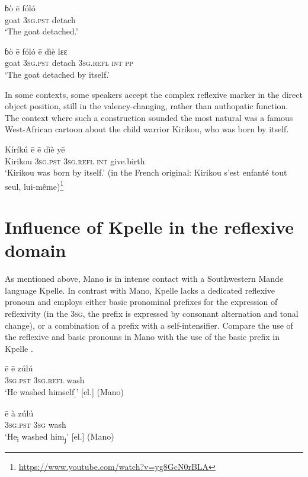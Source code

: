 \documentclass[output=paper]{langscibook}
\begin{document}
\ex
    \label{ex:Kachaturyan:40b}
\gll ɓò  ē  fóló\\
     goat  3\textsc{sg.pst}  detach\\
\glt ‘The goat detached.’

\ex
    \label{ex:Kachaturyan:40c}
\gll ɓò  ē  fóló  ē  dìè  lɛɛ\\
     goat  3\textsc{sg.pst}  detach  3\textsc{sg.refl}  \textsc{int}  \textsc{pp}\\
\glt ‘The goat detached by itself.’
\z
\z

In some contexts, some speakers accept the complex reflexive marker in the direct object position, still in the valency-changing, rather than authopatic function. The context where such a construction sounded the most natural was a famous West-African cartoon about the child warrior Kirikou, who was born by itself.

\ea
    \label{ex:Kachaturyan:41}
 \gll Kíríkú    ē  ē  dìè  yē\\
     Kirikou  \textsc{3sg.pst}  \textsc{3sg.refl}  \textsc{int}  give.birth\\
\glt ‘Kirikou was born by itself.’ (in the French original: Kirikou s’est enfanté tout seul, lui-même)\footnote{\url{https://www.youtube.com/watch?v=yg8GcN0rBLA}}\z


 \section{Influence of Kpelle in the reflexive domain}
\label{sec:Kachaturyan:7}

As mentioned above, Mano is in intense contact with a Southwestern Mande language Kpelle. In contrast with Mano, Kpelle lacks a dedicated reflexive pronoun and employs either basic pronominal prefixes for the expression of reflexivity (in the \textsc{3sg}, the prefix is expressed by consonant alternation and tonal change), or a combination of a prefix with a self-intensifier. Compare the use of the reflexive  and basic  pronouns in Mano with the use of the basic prefix in Kpelle .

\ea
    \label{ex:Kachaturyan:42}
 \gll ē  ē  zúlú\\
       \textsc{3sg.pst}  \textsc{3sg.refl}  wash\\
\glt ‘He washed himself\textsubscript{.}’ [el.] (Mano)
\z

\ea
    \label{ex:Kachaturyan:43}
 \gll ē  à  zúlú\\
       \textsc{3sg.pst}  \textsc{3sg}  wash \\
\glt ‘He\textsubscript{i} washed him\textsubscript{j}’ [el.] (Mano)
\z
\end{document}
